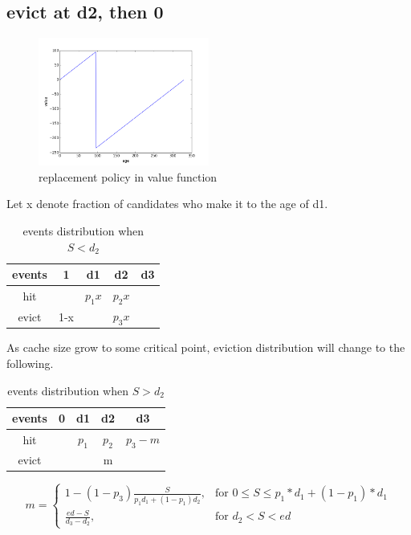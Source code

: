 \documentclass[12pt, letterpaper]{article}
\begin{document}
\subsection{evict at d2, then 0}

\begin{figure}[H]
\centering
\includegraphics[width=0.5\textwidth]{evict_d2.png}
\caption{replacement policy in value function}
\end{figure}

Let x denote fraction of candidates who make it to the age of d1.

\begin{table}[H]
\begin{center}
\begin{tabular}{c | c c c c}
\hline
events & 1 & d1 & d2 & d3 \\
\hline
hit & & $p_1 x$ & $p_2 x$ &  \\
evict & 1-x & & $p_3 x$ & 
\end{tabular}
\caption{events distribution when $S<d_2$}
\end{center}
\end{table}

As cache size grow to some critical point, eviction distribution will change to
the following.

\begin{table}[H]
\begin{center}
\begin{tabular}{c | c c c c}
\hline
events & 0 & d1 & d2 & d3 \\
\hline
hit & & $p_1$ & $p_2$ & $p_3-m$ \\
evict & & & m & 
\end{tabular}
\caption{events distribution when $S > d_2$}
\end{center}
\end{table}

\[
m = \left\{\begin{array}{lr}
      1-(1-p_3) \frac{S}{p_1 d_1 + (1-p_1) d_2}, & \text{for } 0 \leq S \leq p_1*d_1 + (1-p_1)*d_1 \\
      \frac{ed-S}{d_3-d_2}, & \text{for } d_2 < S < ed
           \end{array}
           \right.
\]
\end{document}
